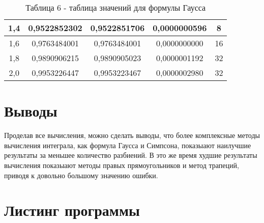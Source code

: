 \documentclass[a4paper,12pt]{article}
\begin{document}
{\begin{enumerate}[label = \arabic*.]
{\begin{table}[h]
\begin{tabular}{|c|c|c|c|c|}
            \hline
            1,4 & 0,9522852302 & 0,9522851706 & 0,0000000596 & 8\\
            \hline
            1,6 & 0,9763484001 & 0,9763484001 & 0,0000000000 & 16\\
            \hline
            1,8 & 0,9890906215 & 0,9890905023 & 0,0000001192 & 32\\
            \hline
            2,0 & 0,9953226447 & 0,9953223467 & 0,0000002980 & 32\\
            \hline
          \end{tabular}
          \caption*{\small{Таблица 6 - таблица значений для формулы Гаусса}}
        \end{table}
    }
\end{enumerate}
\section{Выводы}
\hspace{1.25cm}Проделав все вычисления, можно сделать выводы, что более комплексные методы вычисления интеграла, как формула Гаусса и Симпсона, показыают наилучшие результа\-ты за меньшее количество разбиений. В это же время худшие результаты вычисления показыают методы правых прямоугольников и метод трапеций, приводя к довольно большому значению ошибки.}
\clearpage
\section{Листинг программы}

\end{document}
